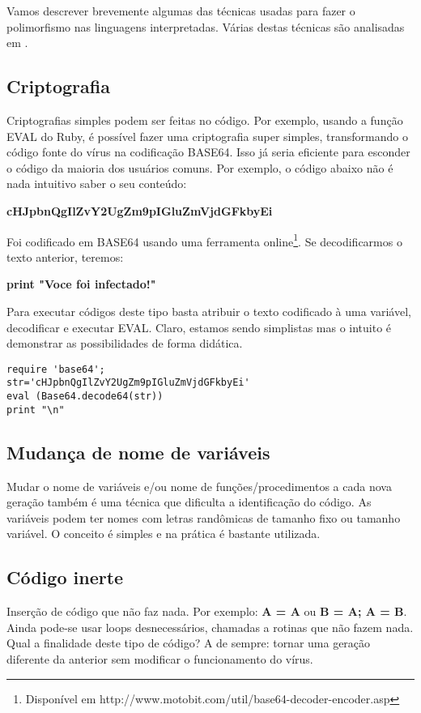 Vamos descrever brevemente algumas das técnicas usadas para fazer o polimorfismo nas linguagens interpretadas. Várias destas técnicas são analisadas em \cite{szappanos:1}.

\subsection{Criptografia}
Criptografias simples podem ser feitas no código. Por exemplo, usando a função EVAL do Ruby, é possível fazer uma criptografia super simples, transformando o código fonte do vírus na codificação BASE64. Isso já seria eficiente para esconder o código da maioria dos usuários comuns. Por exemplo, o código abaixo não é nada intuitivo saber o seu conteúdo:

\textbf{cHJpbnQgIlZvY2UgZm9pIGluZmVjdGFkbyEi}

Foi codificado em BASE64 usando uma ferramenta online\footnote{Disponível em http://www.motobit.com/util/base64-decoder-encoder.asp}. Se decodificarmos o texto anterior, teremos:

\textbf{print "Voce foi infectado!"}

Para executar códigos deste tipo basta atribuir o texto codificado à uma variável, decodificar e executar EVAL. Claro, estamos sendo simplistas mas o intuito é demonstrar as possibilidades de forma didática.

{{{
\renewcommand{\baselinestretch}{1.0}
\begin{verbatim}
require 'base64';
str='cHJpbnQgIlZvY2UgZm9pIGluZmVjdGFkbyEi'
eval (Base64.decode64(str))
print "\n"
\end{verbatim}
}}}

\subsection{Mudança de nome de variáveis}
Mudar o nome de variáveis e/ou nome de funções/procedimentos a cada nova geração também é uma técnica que dificulta a identificação do código. As variáveis podem ter nomes com letras randômicas de tamanho fixo ou tamanho variável. O conceito é simples e na prática é bastante utilizada.

\subsection{Código inerte}
Inserção de código que não faz nada. Por exemplo: \textbf{A = A} ou \textbf{B = A; A = B}. Ainda pode-se usar loops desnecessários, chamadas a rotinas que não fazem nada. Qual a finalidade deste tipo de código? A de sempre: tornar uma geração diferente da anterior sem modificar o funcionamento do vírus.


